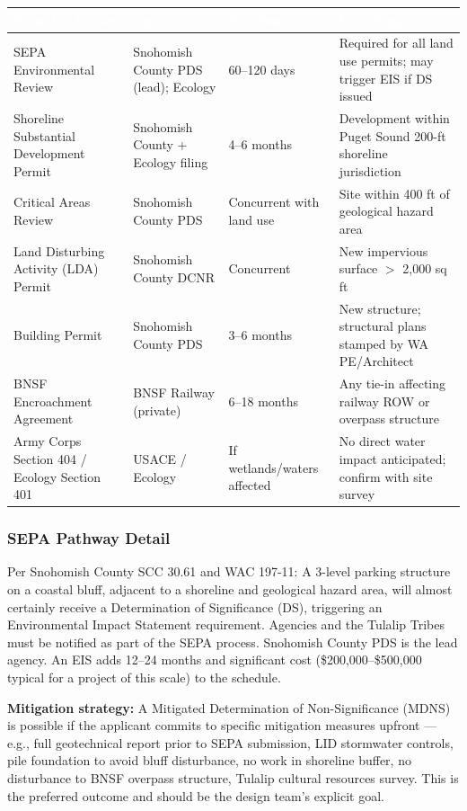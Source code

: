 \documentclass[11pt,letterpaper]{article}
\newcommand{\tableheader}[1]{\textbf{\sffamily\textcolor{white}{#1}}}
\begin{document}
\begin{center}
\begin{tabularx}{\textwidth}{L{3.5cm}L{2.5cm}L{2cm}X}
\toprule
{}
\tableheader{Permit / Review} & \tableheader{Agency} & \tableheader{Est. Duration} & \tableheader{Key Trigger} \\
\midrule
SEPA Environmental Review & Snohomish County PDS (lead); Ecology & 60--120 days & Required for all land use permits; may trigger EIS if DS issued \\
Shoreline Substantial Development Permit & Snohomish County + Ecology filing & 4--6 months & Development within Puget Sound 200-ft shoreline jurisdiction \\
Critical Areas Review & Snohomish County PDS & Concurrent with land use & Site within 400 ft of geological hazard area \\
Land Disturbing Activity (LDA) Permit & Snohomish County DCNR & Concurrent & New impervious surface $>$ 2,000 sq ft \\
Building Permit & Snohomish County PDS & 3--6 months & New structure; structural plans stamped by WA PE/Architect \\
BNSF Encroachment Agreement & BNSF Railway (private) & 6--18 months & Any tie-in affecting railway ROW or overpass structure \\
Army Corps Section 404 / Ecology Section 401 & USACE / Ecology & If wetlands/waters affected & No direct water impact anticipated; confirm with site survey \\
\bottomrule
\end{tabularx}
\end{center}

\subsubsection{SEPA Pathway Detail}

Per Snohomish County SCC 30.61 and WAC 197-11: A 3-level parking structure on a coastal bluff, adjacent to a shoreline and geological hazard area, will almost certainly receive a Determination of Significance (DS), triggering an Environmental Impact Statement requirement. Agencies and the Tulalip Tribes must be notified as part of the SEPA process. Snohomish County PDS is the lead agency. An EIS adds 12--24 months and significant cost (\$200,000--\$500,000 typical for a project of this scale) to the schedule.

\textbf{Mitigation strategy:} A Mitigated Determination of Non-Significance (MDNS) is possible if the applicant commits to specific mitigation measures upfront --- e.g., full geotechnical report prior to SEPA submission, LID stormwater controls, pile foundation to avoid bluff disturbance, no work in shoreline buffer, no disturbance to BNSF overpass structure, Tulalip cultural resources survey. This is the preferred outcome and should be the design team's explicit goal.
\end{document}
